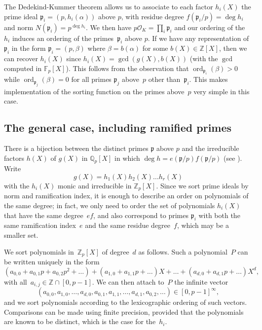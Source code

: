 \documentclass{article}
\def\Z{{\mathbb Z}}
\def\Q{{\mathbb Q}}
\def\F{{\mathbb F}}
\def\OO{{\mathcal O}}
\def\p{{\mathfrak p}}
\DeclareMathOperator{\disc}{disc}
\DeclareMathOperator{\ord}{ord}
\begin{document}
The Dedekind-Kummer theorem allows us to associate to each factor
$h_i(X)$ the prime ideal $\p_i=(p,h_i(\alpha))$ above $p$, with
residue degree $f(\p_i/p)=\deg h_i$ and norm $N(\p_i)=p^{\deg h_i}$.
We then have $p\OO_K=\prod_i \p_i$ and our ordering of the $h_i$
induces an ordering of the primes~$\p_i$ above $p$.  If we have any
representation of $\p_i$ in the form $\p_i=(p,\beta)$ where
$\beta=b(\alpha)$ for some $b(X)\in\Z[X]$, then we can recover
$h_i(X)$ since $h_i(X)=\gcd(g(X),b(X))$ (with the $\gcd$ computed in
$\F_p[X]$).  This follows from the observation that
$\ord_{\p_i}(\beta)>0$ while $\ord_{\p_j}(\beta)=0$ for all primes
$\p_j$ above~$p$ other than~$\p_i$.  This makes implementation of the
sorting function on the primes above~$p$ very simple in this case.

\subsection{The general case, including ramified primes}

There is a bijection between the distinct primes $\p$ above $p$ and
the irreducible factors $h(X)$ of $g(X)$ in $\Q_p[X]$ in which $\deg h
= e(\p/p)f(\p/p)$ (see \cite[Theorem 3.8 (d)]{Janusz}).  Write
\[
  g(X) = h_1(X)h_2(X)\dots h_r(X)
\]
with the $h_i(X)$ monic and irreducible in $\Z_p[X]$. Since we sort
prime ideals by norm and ramification index, it is enough to describe
an order on polynomials of the same degree; in fact, we only need to
order the set of polynomials $h_i(X)$ that have the same degree~$ef$,
and also correspond to primes $\p_i$ with both the same ramification
index~$e$ and the same residue degree~$f$, which may be a smaller set.

We sort polynomials in~$\Z_p[X]$ of degree~$d$ as follows. Such a polynomial~$P$
can be written uniquely in the form
\[
  (a_{0,0}+a_{0,1}p+a_{0,2}p^2+\dots) + (a_{1,0}+a_{1,1}p+\dots)X
  + \dots + (a_{d,0}+a_{d,1}p+\dots)X^d,
\]
with all~$a_{i,j}\in\Z\cap[0,p-1]$. We can then attach to~$P$ the infinite
vector
\[
(a_{0,0},a_{1,0},\dots,a_{d,0},a_{0,1},a_{1,1},\dots,a_{d,1},a_{0,2},\dots)\in [0,p-1]^\infty,
\]
and we sort polynomials according to the lexicographic ordering of such vectors.
Comparisons can be made using finite precision, provided that the polynomials are known to be
distinct, which is the case for the~$h_i$.

\end{document}

